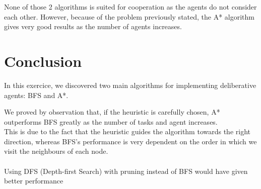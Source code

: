 \documentclass[fontsize=12pt]{scrartcl} %
\begin{document}
None of those 2 algorithms is suited for cooperation as the agents do not consider each other. However, because of the problem previously stated, the A* algorithm gives very good results as the number of agents increases.



\section*{Conclusion}

In this exercice, we discovered two main algorithms for implementing deliberative agents: BFS and A*. 

We proved by observation that, if the heuristic is carefully chosen, A* outperforms BFS greatly as the number of tasks and agent increases. \\
This is due to the fact that the heuristic guides the algorithm towards the right direction, whereas BFS's performance is very dependent on the order in which we visit the neighbours of each node. \\ \\
Using DFS (Depth-first Search) with pruning instead of BFS would have given better performance
\end{document}
